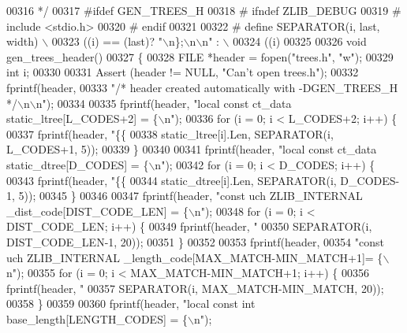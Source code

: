 \begin{DoxyCode}
{{00316 \textcolor{comment}{ */}
00317 \textcolor{preprocessor}{#ifdef GEN\_TREES\_H}
00318 \textcolor{preprocessor}{#  ifndef ZLIB\_DEBUG}
00319 \textcolor{preprocessor}{#    include <stdio.h>}
00320 \textcolor{preprocessor}{#  endif}
00321 
00322 \textcolor{preprocessor}{#  define SEPARATOR(i, last, width) \(\backslash\)}
00323 \textcolor{preprocessor}{      ((i) == (last)? "\(\backslash\)n\};\(\backslash\)n\(\backslash\)n" :    \(\backslash\)}
00324 \textcolor{preprocessor}{       ((i) %
00325 
00326 \textcolor{keywordtype}{void} gen\_trees\_header()
00327 \{
00328     FILE *header = fopen(\textcolor{stringliteral}{"trees.h"}, \textcolor{stringliteral}{"w"});
00329     \textcolor{keywordtype}{int} i;
00330 
00331     Assert (header != NULL, \textcolor{stringliteral}{"Can't open trees.h"});
00332     fprintf(header,
00333             \textcolor{stringliteral}{"/* header created automatically with -DGEN\_TREES\_H */\(\backslash\)n\(\backslash\)n"});
00334 
00335     fprintf(header, \textcolor{stringliteral}{"local const ct\_data static\_ltree[L\_CODES+2] = \{\(\backslash\)n"});
00336     \textcolor{keywordflow}{for} (i = 0; i < L\_CODES+2; i++) \{
00337         fprintf(header, \textcolor{stringliteral}{"\{\{%
00338                 static\_ltree[i].Len, SEPARATOR(i, L\_CODES+1, 5));
00339     \}
00340 
00341     fprintf(header, \textcolor{stringliteral}{"local const ct\_data static\_dtree[D\_CODES] = \{\(\backslash\)n"});
00342     \textcolor{keywordflow}{for} (i = 0; i < D\_CODES; i++) \{
00343         fprintf(header, \textcolor{stringliteral}{"\{\{%
00344                 static\_dtree[i].Len, SEPARATOR(i, D\_CODES-1, 5));
00345     \}
00346 
00347     fprintf(header, \textcolor{stringliteral}{"const uch ZLIB\_INTERNAL \_dist\_code[DIST\_CODE\_LEN] = \{\(\backslash\)n"});
00348     \textcolor{keywordflow}{for} (i = 0; i < DIST\_CODE\_LEN; i++) \{
00349         fprintf(header, \textcolor{stringliteral}{"%
00350                 SEPARATOR(i, DIST\_CODE\_LEN-1, 20));
00351     \}
00352 
00353     fprintf(header,
00354         \textcolor{stringliteral}{"const uch ZLIB\_INTERNAL \_length\_code[MAX\_MATCH-MIN\_MATCH+1]= \{\(\backslash\)n"});
00355     \textcolor{keywordflow}{for} (i = 0; i < MAX\_MATCH-MIN\_MATCH+1; i++) \{
00356         fprintf(header, \textcolor{stringliteral}{"%
00357                 SEPARATOR(i, MAX\_MATCH-MIN\_MATCH, 20));
00358     \}
00359 
00360     fprintf(header, \textcolor{stringliteral}{"local const int base\_length[LENGTH\_CODES] = \{\(\backslash\)n"});
}}}}}}}
\end{DoxyCode}
